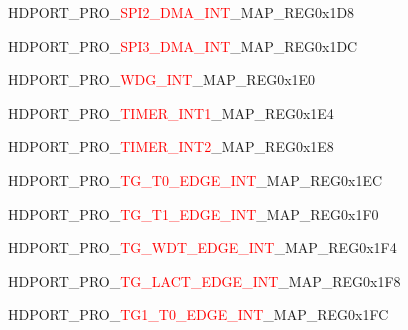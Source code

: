 \vspace{-3em}
\begin{register}{H}{DPORT\_PRO\_\textcolor{red}{SPI2\_DMA\_INT}\_MAP\_REG}{0x1D8}\label{regdesc:PROSPI2DMAINTMAPREG}
\end{register}
\vspace{-3em}
\begin{register}{H}{DPORT\_PRO\_\textcolor{red}{SPI3\_DMA\_INT}\_MAP\_REG}{0x1DC}\label{regdesc:PROSPI3DMAINTMAPREG}
\end{register}
\vspace{-3em}
\begin{register}{H}{DPORT\_PRO\_\textcolor{red}{WDG\_INT}\_MAP\_REG}{0x1E0}\label{regdesc:PROWDGINTMAPREG}
\end{register}
\vspace{-3em}
\begin{register}{H}{DPORT\_PRO\_\textcolor{red}{TIMER\_INT1}\_MAP\_REG}{0x1E4}\label{regdesc:PROTIMERINT1MAPREG}
\end{register}
\vspace{-3em}
\begin{register}{H}{DPORT\_PRO\_\textcolor{red}{TIMER\_INT2}\_MAP\_REG}{0x1E8}\label{regdesc:PROTIMERINT2MAPREG}
\end{register}
\vspace{-3em}
\begin{register}{H}{DPORT\_PRO\_\textcolor{red}{TG\_T0\_EDGE\_INT}\_MAP\_REG}{0x1EC}\label{regdesc:PROTGT0EDGEINTMAPREG}
\end{register}
\vspace{-3em}
\begin{register}{H}{DPORT\_PRO\_\textcolor{red}{TG\_T1\_EDGE\_INT}\_MAP\_REG}{0x1F0}\label{regdesc:PROTGT1EDGEINTMAPREG}
\end{register}
\vspace{-3em}
\begin{register}{H}{DPORT\_PRO\_\textcolor{red}{TG\_WDT\_EDGE\_INT}\_MAP\_REG}{0x1F4}\label{regdesc:PROTGWDTEDGEINTMAPREG}
\end{register}
\vspace{-3em}
\begin{register}{H}{DPORT\_PRO\_\textcolor{red}{TG\_LACT\_EDGE\_INT}\_MAP\_REG}{0x1F8}\label{regdesc:PROTGLACTEDGEINTMAPREG}
\end{register}
\vspace{-3em}
\begin{register}{H}{DPORT\_PRO\_\textcolor{red}{TG1\_T0\_EDGE\_INT}\_MAP\_REG}{0x1FC}\label{regdesc:PROTG1T0EDGEINTMAPREG}
\end{register}
